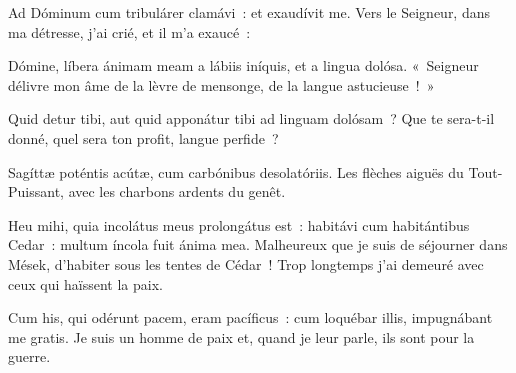 
\begin{paracol}{2}

\LigneParacol{0cm}
{Ad Dóminum cum tribulárer clamávi~: \GreStar{} et exaudívit me.}
{Vers le Seigneur, dans ma détresse, j'ai crié, et il m'a exaucé~:}

\LigneParacol{0.2cm}
{Dómine, líbera ánimam meam a lábiis iníquis, \GreStar{} et a lingua dolósa.}
{«~Seigneur délivre mon âme de la lèvre de mensonge, de la langue astucieuse~!~»}

\LigneParacol{0.2cm}
{Quid detur tibi, aut quid apponátur tibi \GreStar{} ad linguam dolósam~?}
{Que te sera-t-il donné, quel sera ton profit, langue perfide~?}

\LigneParacol{0.2cm}
{Sagíttæ poténtis acútæ, \GreStar{} cum carbónibus desolatóriis.}
{Les flèches aiguës du Tout-Puissant, avec les charbons ardents du genêt.}

\LigneParacol{0.2cm}
{Heu mihi, quia incolátus meus prolongátus est~: habitávi cum habitántibus Cedar~: \GreStar{} multum íncola fuit ánima mea.}
{Malheureux que je suis de séjourner dans Mések, d'habiter sous les tentes de Cédar~! Trop longtemps j'ai demeuré avec ceux qui haïssent la paix.}

\LigneParacol{0.2cm}
{Cum his, qui odérunt pacem, eram pacíficus~: \GreStar{} cum loquébar illis, impugnábant me gratis.}
{Je suis un homme de paix et, quand je leur parle, ils sont pour la guerre.}

\end{paracol}
\Gloria
{}
